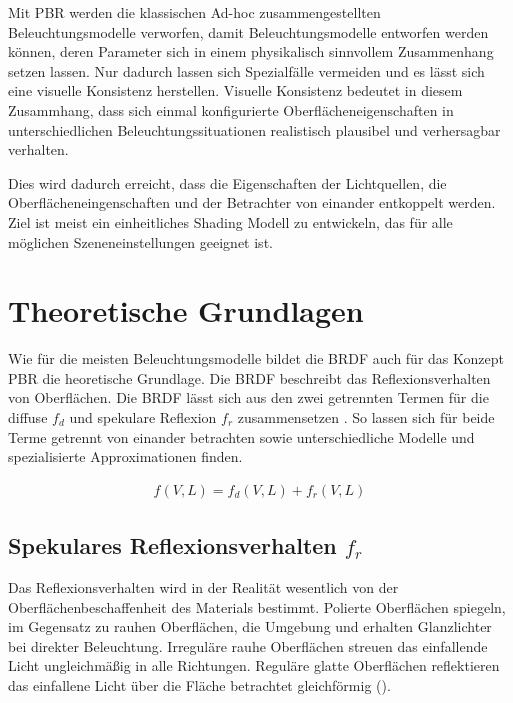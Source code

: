 Mit \ac{PBR} werden die klassischen Ad-hoc zusammengestellten Beleuchtungsmodelle verworfen, damit Beleuchtungsmodelle entworfen werden können, deren Parameter sich in einem physikalisch sinnvollem Zusammenhang setzen lassen. Nur dadurch lassen sich Spezialfälle vermeiden und es lässt sich eine visuelle Konsistenz herstellen. Visuelle Konsistenz bedeutet in diesem Zusammhang, dass sich einmal konfigurierte Oberflächeneigenschaften in unterschiedlichen Beleuchtungssituationen realistisch plausibel und verhersagbar verhalten. 

Dies wird dadurch erreicht, dass die Eigenschaften der Lichtquellen, die Oberflächeneingenschaften und der Betrachter von einander entkoppelt werden. Ziel ist meist ein einheitliches Shading Modell zu entwickeln, das für alle möglichen Szeneneinstellungen geeignet ist.

\section{Theoretische Grundlagen}
\label{sec:pbr-grundlagen}

Wie für die meisten Beleuchtungsmodelle bildet die \ac{BRDF} auch für das Konzept \ac{PBR} die heoretische Grundlage. Die \ac{BRDF} beschreibt das Reflexionsverhalten von Oberflächen. Die BRDF lässt sich aus den zwei getrennten Termen für die diffuse $f_d$ und spekulare Reflexion $f_r$ zusammensetzen \parencite[Kapitel 3.1.2, Seite 7]{Rousiers2014}. So lassen sich für beide Terme getrennt von einander betrachten sowie unterschiedliche Modelle und spezialisierte Approximationen finden.

\begin{align}
	\label{eq:brdf-dekonstruiert}
	f(V,L) = f_d(V,L) + f_r(V,L)
\end{align}

\subsection[Spekulares Reflexionsverhalten]{Spekulares Reflexionsverhalten $f_r$}
Das Reflexionsverhalten wird in der Realität wesentlich von der Oberflächenbeschaffenheit des Materials bestimmt. Polierte Oberflächen spiegeln, im Gegensatz zu rauhen Oberflächen, die Umgebung und erhalten Glanzlichter bei direkter Beleuchtung. Irreguläre rauhe Oberflächen streuen das einfallende Licht ungleichmäßig in alle Richtungen. Reguläre glatte Oberflächen reflektieren das einfallene Licht über die Fläche betrachtet gleichförmig ().

